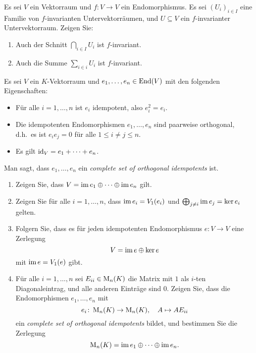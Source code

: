 \documentclass[a4paper,10pt]{scrartcl}
\begin{document}
\begin{question}
  Es sei $V$ ein Vektorraum und $f \colon V \to V$ ein Endomorphismus.
  Es sei $(U_i)_{i \in I}$ eine Familie von $f$-invarianten Untervektorräumen, und $U \subseteq V$ ein $f$-invarianter Untervektorraum.
  Zeigen Sie:
  \begin{enumerate}[leftmargin=*]
    \item
      Auch der Schnitt $\bigcap_{i \in I} U_i$ ist $f$-invariant.
    \item
      Auch die Summe $\sum_{i \in i} U_i$ ist $f$-invariant.
  \end{enumerate}
\end{question}


\begin{question}
  Es sei $V$ ein $K$-Vektorraum und $e_1, \dotsc, e_n \in \operatorname{End}(V)$ mit den folgenden Eigenschaften:
  \begin{itemize}
    \item
      Für alle $i = 1, \dotsc, n$ ist $e_i$ idempotent, also $e_i^2 = e_i$.
    \item
      Die idempotenten Endomorphismen $e_1, \dotsc, e_n$ sind paarweise orthogonal, d.h.\ es ist $e_i e_j = 0$ für alle $1 \leq i \neq j \leq n$.
    \item
      Es gilt $\operatorname{id}_V = e_1 + \dotsb + e_n$.
  \end{itemize}
  Man sagt, dass $e_1, \dotsc, e_n$ ein \emph{complete set of orthogonal idempotents} ist.
  \begin{enumerate}[leftmargin=*]
    \item
      Zeigen Sie, dass $V = \operatorname{im} e_1 \oplus \dotsb \oplus \operatorname{im} e_n$ gilt.
    \item
      Zeigen Sie für alle $i = 1, \dotsc, n$, dass $\operatorname{im} e_i = V_1(e_i)$ und $\bigoplus_{j \neq i} \operatorname{im} e_j = \ker e_i$ gelten.
    \item
      Folgern Sie, dass es für jeden idempotenten Endomorphismus $e \colon V \to V$ eine Zerlegung
      \[
        V = \operatorname{im} e \oplus \ker e
      \]
      mit $\operatorname{im} e = V_1(e)$ gibt.
    \item
      Für alle $i = 1, \dotsc, n$ sei $E_{ii} \in \operatorname{M}_n(K)$ die Matrix mit $1$ als $i$-ten Diagonaleintrag, und alle anderen Einträge sind $0$.
      Zeigen Sie, dass die Endomorphismen $e_1, \dotsc, e_n$ mit
      \[
        e_i \colon \operatorname{M}_n(K) \to \operatorname{M}_n(K),
        \quad
        A \mapsto A E_{ii}
      \]
      ein \emph{complete set of orthogonal idempotents} bildet, und bestimmen Sie die Zerlegung
      \[
        \operatorname{M}_n(K) = \operatorname{im} e_1 \oplus \dotsb \oplus \operatorname{im} e_n.
      \]
  \end{enumerate}
\end{question}
\end{document}

